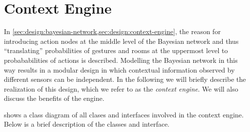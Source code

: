 \section{Context Engine}
\label{sec:implementation:context-engine}

In \cref{sec:design:bayesian-network,sec:design:context-engine}, the reason for introducing action nodes at the middle level of the Bayesian network and thus ``translating'' probabilities of gestures and rooms at the uppermost level to probababilities of actions is described. Modelling the Bayesian network in this way results in a modular design in which contextual information observed by different sensors can be independent. In the following we will briefly describe the realization of this design, which we refer to as the \emph{context engine}. We will also discuss the benefits of the engine.

 shows a class diagram of all clases and interfaces involved in the context engine. Below is a brief description of the classes and interface.

